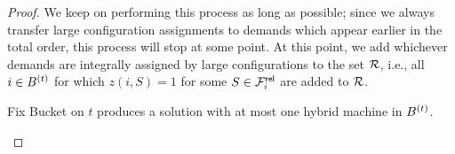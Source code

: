 \begin{proof}
	
	We keep on performing this process as long as possible; since we always transfer large configuration assignments to demands which appear earlier in the total order, this process will stop at some point. At this point, we add whichever demands are integrally assigned by large configurations to 
	the set ${\cal R}$, i.e., all $i \in B^{(t)}$ for which   $z(i,S) = 1$ for some $S\in {\cal F}^{\mathsf{rel}}_i$ are added to ${\cal R}$.
%	
%	
\begin{claim}\label{clm:step2}
	Fix Bucket on $t$ produces a solution with at most one hybrid machine in $B^{(t)}$.
\end{claim}
	





\end{proof}
